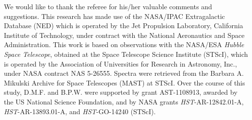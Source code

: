 We would like to thank the referee for his/her valuable comments and suggestions. This research has made use of the NASA/IPAC Extragalactic Database (NED) which is operated by the Jet Propulsion Laboratory, California Institute of Technology, under contract with the National Aeronautics and Space Administration. This work is based on observations with the NASA/ESA \textit{Hubble Space Telescope}, obtained at the Space Telescope Science Institute (STScI), which is operated by the Association of Universities for Research in Astronomy, Inc., under NASA contract NAS 5-26555. Spectra were retrieved from the Barbara A. Mikulski Archive for Space Telescopes (MAST) at STScI. Over the course of this study, D.M.F. and B.P.W. were supported by grant AST-1108913, awarded by the US National Science Foundation, and by NASA grants \textit{HST}-AR-12842.01-A, \textit{HST}-AR-13893.01-A, and \textit{HST}-GO-14240 (STScI).
%


\nocite{*}

%




